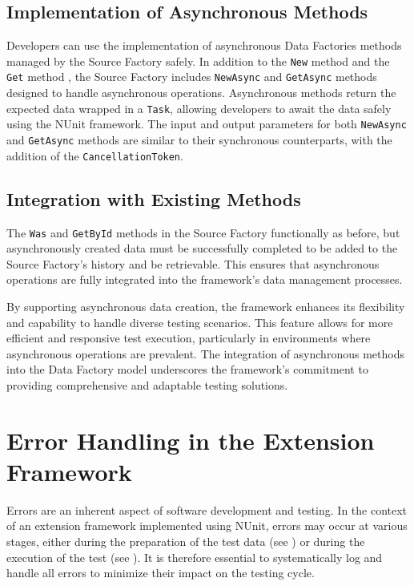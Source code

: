 \subsection{Implementation of Asynchronous Methods}
Developers can use the implementation of asynchronous Data Factories methods managed by the Source Factory safely. In addition to the \texttt{New} method  and the \texttt{Get} method , the Source Factory includes \texttt{NewAsync} and \texttt{GetAsync} methods designed to handle asynchronous operations. Asynchronous methods return the expected data wrapped in a \texttt{Task}, allowing developers to await the data safely using the NUnit framework. The input and output parameters for both \texttt{NewAsync} and \texttt{GetAsync} methods are similar to their synchronous counterparts, with the addition of the \texttt{CancellationToken}.

\subsection{Integration with Existing Methods}
The \texttt{Was}  and \texttt{GetById}  methods in the Source Factory functionally as before, but asynchronously created data must be successfully completed to be added to the Source Factory's history and be retrievable. This ensures that asynchronous operations are fully integrated into the framework's data management processes.

By supporting asynchronous data creation, the framework enhances its flexibility and capability to handle diverse testing scenarios. This feature allows for more efficient and responsive test execution, particularly in environments where asynchronous operations are prevalent. The integration of asynchronous methods into the Data Factory model underscores the framework's commitment to providing comprehensive and adaptable testing solutions.

\section{Error Handling in the Extension Framework}

Errors are an inherent aspect of software development and testing. In the context of an extension framework implemented using NUnit, errors may occur at various stages, either during the preparation of the test data (see ) or during the execution of the test (see ). It is therefore essential to systematically log and handle all errors to minimize their impact on the testing cycle.


